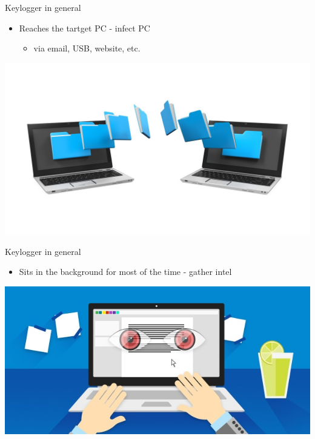 \documentclass{beamer}
\begin{document}
\begin{frame}[t]{Keylogger in general}
\begin{itemize}
	\item Reaches the tartget PC - infect PC
	\begin{itemize}
		\item via email, USB, website, etc.
	\end{itemize}
\end{itemize}
\includegraphics[scale=1]{../images/datatransfer}
\end{frame}

\begin{frame}[t]{Keylogger in general}
\begin{itemize}
	\item Sits in the background for most of the time - gather intel
\end{itemize}
\vspace{1.75em}
\includegraphics[scale=0.50]{../images/keyloggerbackground}
\end{frame}
\end{document}
